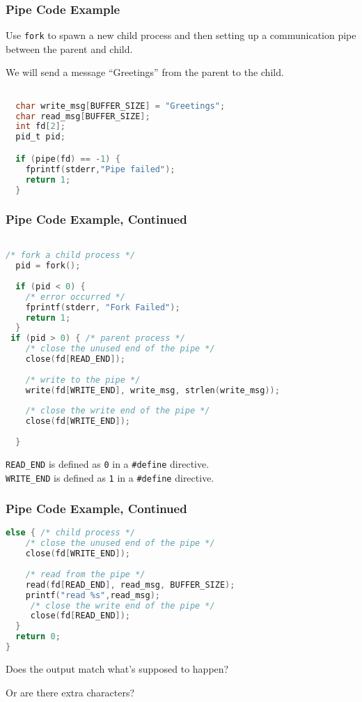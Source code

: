 \begin{frame}[fragile]
	\frametitle{Pipe Code Example}

	Use \texttt{fork} to spawn a new child process and then setting up a communication pipe between the parent and child.

	We will send a message ``Greetings'' from the parent to the child.

	\begin{lstlisting}[language=C]

  char write_msg[BUFFER_SIZE] = "Greetings"; 
  char read_msg[BUFFER_SIZE];
  int fd[2];
  pid_t pid;

  if (pipe(fd) == -1) {
    fprintf(stderr,"Pipe failed");
    return 1;
  }

\end{lstlisting}


\end{frame}

\begin{frame}[fragile]
	\frametitle{Pipe Code Example, Continued}

	\begin{lstlisting}[language=C]

/* fork a child process */
  pid = fork();
  
  if (pid < 0) { 
    /* error occurred */ 
    fprintf(stderr, "Fork Failed"); 
    return 1;
  }
 if (pid > 0) { /* parent process */
    /* close the unused end of the pipe */ 
    close(fd[READ_END]);
    
    /* write to the pipe */
    write(fd[WRITE_END], write_msg, strlen(write_msg));
    
    /* close the write end of the pipe */
    close(fd[WRITE_END]);
    
  } 

\end{lstlisting}

	\texttt{READ\_END} is defined as \texttt{0} in a \texttt{\#define} directive.\\
	\texttt{WRITE\_END} is defined as \texttt{1} in a \texttt{\#define} directive.

\end{frame}

\begin{frame}[fragile]
	\frametitle{Pipe Code Example, Continued}


	\begin{lstlisting}[language=C]
  else { /* child process */
    /* close the unused end of the pipe */ 
    close(fd[WRITE_END]);
    
    /* read from the pipe */
    read(fd[READ_END], read_msg, BUFFER_SIZE); 
    printf("read %s",read_msg);
     /* close the write end of the pipe */
     close(fd[READ_END]); 
  }
  return 0;
}
\end{lstlisting}

	Does the output match what's supposed to happen?

	Or are there extra characters?

\end{frame}

